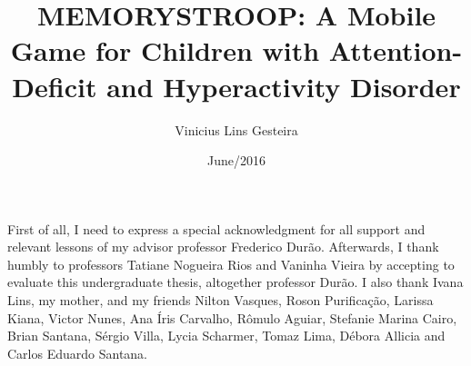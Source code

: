 \documentclass[pr-br,twoside,onehalfspacing,bsc]{risethesis}
\title{MEMORYSTROOP: A Mobile Game for Children with Attention-Deficit and Hyperactivity Disorder}
\date{June/2016}
\author{Vinicius Lins Gesteira}
\begin{document}
\frontmatter
\let\cleardoublepage\clearpage
\frontpage
\presentationpage



\acknowledgements

First of all, I need to express a special acknowledgment for all support and relevant lessons of my advisor professor Frederico Dur\~{a}o. Afterwards, I thank humbly to professors Tatiane Nogueira Rios and Vaninha Vieira by accepting to evaluate this undergraduate thesis, altogether professor Dur\~{a}o.
I also thank Ivana Lins, my mother, and my friends Nilton Vasques, Roson Purificação, Larissa Kiana, Victor Nunes, Ana  \'Iris Carvalho, R\^omulo Aguiar, Stefanie Marina Cairo, Brian Santana, S\'ergio Villa, Lycia Scharmer, Tomaz Lima, D\'ebora Allicia and Carlos Eduardo Santana.

\abstract

\let\cleardoublepage\clearpage
\tableofcontents

\listoffigures


\listofacronyms

\let\cleardoublepage\clearpage


\mainmatter












%
\end{document}
